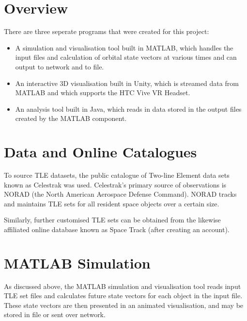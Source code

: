 \documentclass[12pt,openany,a4paper]{book}
\begin{document}
		\section{Overview}
		There are three seperate programs that were created for this project:
		\begin{itemize}
			\item A simulation and visualisation tool built in MATLAB, which handles the input files and calculation of orbital state vectors at various times and can output to network and to file.
			\item An interactive 3D visualisation built in Unity, which is streamed data from MATLAB and which supports the HTC Vive VR Headset.
			\item An analysis tool built in Java, which reads in data stored in the output files created by the MATLAB component.
		\end{itemize}
%		
%		
	
		\section{Data and Online Catalogues}
		To source TLE datasets, the public catalogue of Two-line Element data sets known as Celestrak was used. Celestrak's primary source of observations is NORAD (the North American Aerospace Defense Command). 		NORAD tracks and maintains TLE sets for all resident space objects over a certain size. \cite{SpaceTrk3} \newline
		
		Similarly, further customised TLE sets can be obtained  from the likewise affiliated online database known as Space Track (after creating an account).
		\cite{spaceTrack}
	
		\section{MATLAB Simulation}
		As discussed above, the MATLAB simulation and visualisation tool reads input TLE set files and calculates future state vectors for each object in the input file. These state vectors are then presented in an animated visualisation, and may be stored in file or sent over network. \newline 
		
\end{document}
